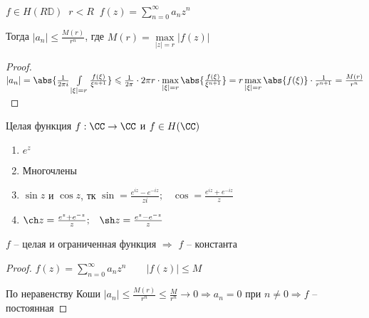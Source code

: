 
\begin{theorem}\thmslashn
	
	$f \in H(R \mathbb{D})\;\;r < R\;\; f(z) =  \sum\limits_{n = 0}^{\infty} a_n z^n$ 
	
	Тогда $|a_n| \leqslant \frac{M(r)}{r^n}$, где $M(r) = \max\limits_{|z| = r} |f(z)|$
	
\end{theorem}

\begin{proof}\thmslashn
	
	 $|a_n| =  \abs{\frac{1}{2\pi i}\int\limits_{|\xi| = r} \frac{f(\xi)}{\xi^{n+1}}} \leqslant \frac{1}{2\pi} \cdot 2\pi r \cdot \max\limits_{|\xi| = r}\abs{\frac{f(\xi)}{\xi^{n+1}}} = r \max\limits_{|\xi| = r}\abs{f(\xi)} \cdot \frac{1}{r^{n+1}} = \frac{M(r)}{r^n}$
	
\end{proof}

\begin{definition}
		Целая функция $f:\CC \to \CC$ и $f\in H(\CC)$
\end{definition}

\begin{example}\thmslashn
	
	\begin{enumerate}
		\item 
		$e^{z}$
		\item
		Многочлены
		\item
		$\sin z$ и $\cos z$, тк $\sin = \frac{e^{iz} - e^{-iz}}{zi};\;\;\; \cos = \frac{e^{iz} + e^{-iz}}{z}$
		\item
		$\ch z = \frac{e^{z} + e^{-z}}{z};\;\;\; \sh z = \frac{e^{z} - e^{-z}}{z}$
	\end{enumerate}
	
\end{example}

\begin{theorem}[Лиувилля]\thmslashn
	
	$f$ -- целая и ограниченная функция $\Rightarrow$ $f$ -- константа
	
\end{theorem}

\begin{proof}\thmslashn
	
	$f(z) = \sum\limits_{n = 0}^{\infty} a_n z^n \qquad |f(z)| \leqslant M$
	
	По неравенству Коши $|a_n| \leqslant \frac{M(r)}{r^n} \leqslant \frac{M}{r^n} \to 0 \Rightarrow a_n = 0$ при $n\not = 0 \Rightarrow f$ -- постоянная
	
\end{proof}

